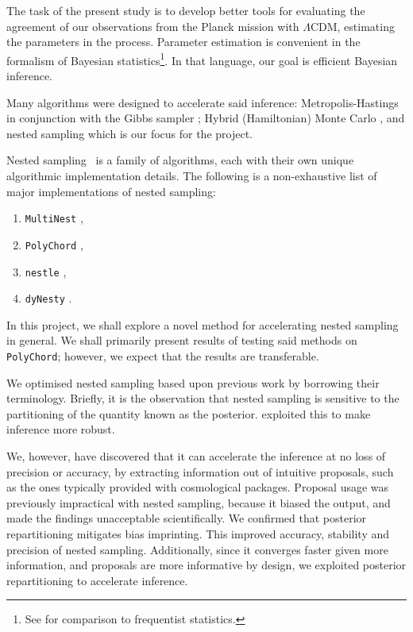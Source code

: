 \documentclass[usenatbib]{mnras}
\begin{document}
The task of the present study is to develop better tools for
evaluating the agreement of our observations from the Planck mission
with \(\Lambda\)CDM, estimating the parameters in the
process. Parameter estimation is convenient in the formalism of
Bayesian statistics\footnote{See \cite{xkcd} for comparison to
  frequentist statistics.}. In that language, our goal is efficient
Bayesian inference.

Many algorithms were designed to accelerate said inference:
Metropolis-Hastings \citep{Metropolis} in conjunction with the Gibbs
sampler \citep{Metropolis-Hastings-Gibbs}; Hybrid (Hamiltonian) Monte
Carlo \citep{1701.02434,Duane_1987}, and nested sampling
\citep{Skilling2006} which is our focus for the project.

Nested sampling~\citep{Skilling2006} is a family of algorithms, each
with their own unique algorithmic implementation details. The
following is a non-exhaustive list of major implementations of nested
sampling:
\begin{enumerate}
\item \texttt{MultiNest} \citep{Feroz2009MultiNestAE},
\item \texttt{PolyChord} \citep{polychord},
\item \texttt{nestle} \citep{nestle},
\item \texttt{dyNesty} \citep{Speagle_2020}.
\end{enumerate}
In this project, we shall explore a novel method for accelerating
nested sampling in general. We shall primarily present results of
testing said methods on \texttt{PolyChord}; however, we expect that
the results are transferable.

We optimised nested sampling based upon previous work by
\cite{chen-ferroz-hobson} borrowing their terminology. Briefly, it is
the observation that nested sampling is sensitive to the partitioning
of the quantity known as the
posterior. \cite{chen-ferroz-hobson} exploited this to make
inference more robust.

We, however, have discovered that it can accelerate the inference at
no loss of precision or accuracy, by extracting information out of
intuitive proposals, such as the ones typically provided with
cosmological packages. Proposal usage was previously impractical with
nested sampling, because it biased the output, and made the findings
unacceptable scientifically. We confirmed that posterior
repartitioning mitigates bias imprinting. This improved accuracy,
stability and precision of nested sampling. Additionally, since it
converges faster given more information, and proposals are more
informative by design, we exploited posterior repartitioning to
accelerate inference.
\end{document}
